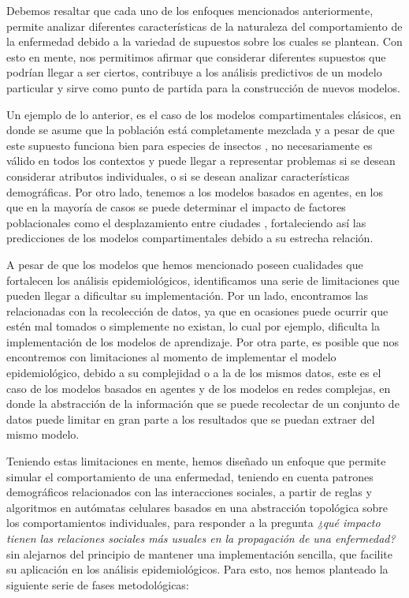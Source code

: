 Debemos resaltar que cada uno de los enfoques mencionados anteriormente, permite analizar diferentes características de la naturaleza del comportamiento de la enfermedad debido a la variedad de supuestos sobre los cuales se plantean. Con esto en mente, nos permitimos afirmar que considerar diferentes supuestos que podrían llegar a ser ciertos, contribuye a los análisis predictivos de un modelo particular y sirve como punto de partida para la construcción de nuevos modelos. 

Un ejemplo de lo anterior, es el caso de los modelos compartimentales clásicos, en donde se asume que la población está completamente mezclada y a pesar de que este supuesto funciona bien para especies de insectos \cite{malariaSIR}, no necesariamente es válido en todos los contextos y puede llegar a representar problemas si se desean considerar atributos individuales, o si se desean analizar características demográficas. Por otro lado, tenemos a los modelos basados en agentes, en los que en la mayoría de casos se puede determinar el impacto de factores poblacionales como el desplazamiento entre ciudades \cite{populationDensity}, fortaleciendo así las predicciones de los modelos compartimentales debido a su estrecha relación.

A pesar de que los modelos que hemos mencionado poseen cualidades que fortalecen los análisis epidemiológicos, identificamos una serie de limitaciones que pueden llegar a dificultar su implementación. Por un lado, encontramos las relacionadas con la recolección de datos, ya que en ocasiones puede ocurrir que estén mal tomados o simplemente no existan, lo cual por ejemplo, dificulta la implementación de los modelos de aprendizaje. Por otra parte, es posible que nos encontremos con limitaciones al momento de implementar el modelo epidemiológico, debido a su complejidad o a la de los mismos datos, este es el caso de los modelos basados en agentes y de los modelos en redes complejas, en donde la abstracción de la información que se puede recolectar de un conjunto de datos puede limitar en gran parte a los resultados que se puedan extraer del mismo modelo.

Teniendo estas limitaciones en mente, hemos diseñado un enfoque que permite simular el comportamiento de una enfermedad, teniendo en cuenta patrones demográficos relacionados con las interacciones sociales, a partir de reglas y algoritmos en autómatas celulares basados en una abstracción topológica sobre los comportamientos individuales, para responder a la pregunta \textit{¿qué impacto tienen las relaciones sociales más usuales en la propagación de una enfermedad?} sin alejarnos del principio de mantener una implementación sencilla, que facilite su aplicación en los análisis epidemiológicos. Para esto, nos hemos planteado la siguiente serie de fases metodológicas:

